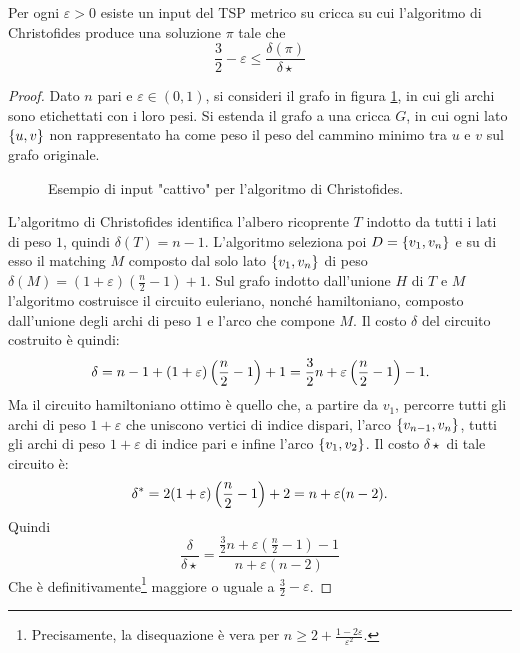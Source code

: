 \begin{theorem}
	Per ogni $\varepsilon>0$ esiste un input del TSP metrico su cricca su cui l'algoritmo di Christofides produce una soluzione $\pi$ tale che
	\begin{equation*}
		\frac 3 2-\varepsilon \leq \frac{\delta(\pi)}{\delta\star}
	\end{equation*}
\end{theorem}
\begin{proof}
	Dato $n$ pari e $\varepsilon\in(0,1)$, si consideri il grafo in figura \ref{fig:christotight}, in cui gli archi sono etichettati con i loro pesi. Si estenda il grafo a una cricca $G$, in cui ogni lato $\set{u,v}$ non rappresentato ha come peso il peso del cammino minimo tra $u$ e $v$ sul grafo originale.

	\begin{figure}[ht]
		\centering
		
		\caption{Esempio di input "cattivo" per l'algoritmo di Christofides.}
		\label{fig:christotight}
	\end{figure}

	L'algoritmo di Christofides identifica l'albero ricoprente $T$ indotto da tutti i lati di peso $1$, quindi $\delta(T)=n-1$.
	L'algoritmo seleziona poi $D=\set{v_1,v_n}$ e su di esso il matching $M$ composto dal solo lato $\set{v_1,v_n}$ di peso $\delta(M)=(1+\varepsilon)\left(\frac n2-1\right)+1$.
	Sul grafo indotto dall'unione $H$ di $T$ e $M$ l'algoritmo costruisce il circuito euleriano, nonché hamiltoniano, composto dall'unione degli archi di peso $1$ e l'arco che compone $M$.
	Il costo $\delta$ del circuito costruito è quindi:
	\begin{equation*}
		\delta = n-1 + (1+\varepsilon)\left(\frac n2-1\right)+1 = \frac32n+\varepsilon\left(\frac n2-1\right)-1 \text.
	\end{equation*}
	Ma il circuito hamiltoniano ottimo è quello che, a partire da $v_1$, percorre tutti gli archi di peso $1+\varepsilon$ che uniscono vertici di indice dispari, l'arco $\set{v_{n-1},v_n}$, tutti gli archi di peso $1+\varepsilon$ di indice pari e infine l'arco $\set{v_1,v_2}$.
	Il costo $\delta\star$ di tale circuito è:
	\begin{equation*}
		\delta\star = 2(1+\varepsilon)\left(\frac n2-1\right) + 2 = n+\varepsilon(n-2) \text.
	\end{equation*}
	Quindi
	\begin{equation*}
		\frac{\delta}{\delta\star} = \frac{\frac32n+\varepsilon\left(\frac n2-1\right)-1}{n+\varepsilon(n-2)}
	\end{equation*}
	Che è definitivamente\footnote{Precisamente, la disequazione è vera per $n\geq 2+\frac{1-2\varepsilon}{\varepsilon^2}$.} maggiore o uguale a $\frac 3 2-\varepsilon$.

\end{proof}


